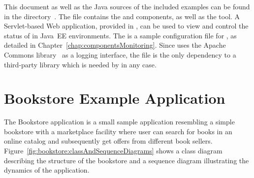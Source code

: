 This document as well as the Java sources of the included examples %
can be found in the directory~\dir{\userGuideDir{}/}. %
The file \file{\mainJar{}} contains the \KiekerMonitoringPart{} and %
\KiekerAnalysisPart{} components, as well as the \KiekerTraceAnalysis{} tool. %
A Servlet-based Web application, provided in \file{\servletWar}, can be used %
to view and control the status of \KiekerMonitoringPart{} in Java~EE %
environments. The \file{\kiekerMonitoringProperties{}} is a sample configuration %
file for \KiekerMonitoringPart{}, as detailed in Chapter~\ref{chap:componentsMonitoring}. %
Since \Kieker{} uses the Apache Commons library~\cite{CommonsLogging-WebSite} %
as a logging interface, the file \file{\commonsLoggingJar} is the only dependency %
to a third-party library which is needed by \Kieker{} in any case. 

\section{Bookstore Example Application}\label{sec:example:bookstore}

The Bookstore application is a small sample application resembling a simple %
bookstore with a marketplace facility where user can search for books in an %
online catalog and subsequently get offers from different book sellers. %
Figure~\ref{fig:bookstore:classAndSequenceDiagrams} shows %
a class diagram describing the structure of the bookstore and %
a sequence diagram illustrating the dynamics of the application. 


